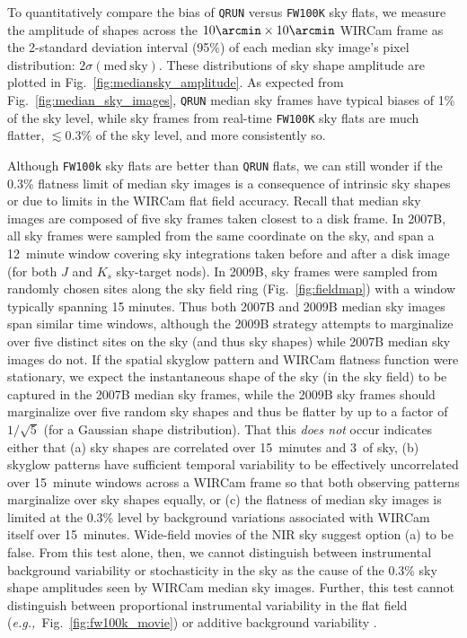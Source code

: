 \documentclass[iop]{emulateapj}
\newcommand{\eg}{\textit{e.g.,~}}
\newcommand{\Fig}[1]{Fig.~\ref{fig:#1}}  %
\begin{document}
To quantitatively compare the bias of \texttt{QRUN} versus \texttt{FW100K} sky flats, we measure the amplitude of shapes across the $10\arcmin \times 10\arcmin$ WIRCam frame as the 2-standard deviation interval (95\%) of each median sky image's pixel distribution: $2 \sigma(\mathrm{med~sky})$.
These distributions of sky shape amplitude are plotted in \Fig{mediansky_amplitude}.
As expected from \Fig{median_sky_images}, \texttt{QRUN} median sky frames have typical biases of 1\% of the sky level, while sky frames from real-time \texttt{FW100K} sky flats are much flatter, $\lesssim 0.3\%$ of the sky level, and more consistently so.

Although \texttt{FW100k} sky flats are better than \texttt{QRUN} flats, we can still wonder if the 0.3\% flatness limit of median sky images is a consequence of intrinsic sky shapes or due to limits in the WIRCam flat field accuracy.
Recall that median sky images are composed of five sky frames taken closest to a disk frame.
In 2007B, all sky frames were sampled from the same coordinate on the sky, and span a 12~minute window covering sky integrations taken before and after a disk image (for both $J$ and $K_s$ sky-target nods).
In 2009B, sky frames were sampled from randomly chosen sites along the sky field ring (\Fig{fieldmap}) with a window typically spanning 15 minutes.
Thus both 2007B and 2009B median sky images span similar time windows, although the 2009B strategy attempts to marginalize over five distinct sites  on the sky (and thus sky shapes) while 2007B median sky images do not.
If the spatial skyglow pattern and WIRCam flatness function were stationary, we expect the instantaneous shape of the sky (in the sky field) to be captured in the 2007B median sky frames, while the 2009B sky frames should marginalize over five random sky shapes and thus be flatter by up to a factor of $1/\sqrt{5}$ (for a Gaussian shape distribution).
That this \emph{does not} occur indicates either that (a) sky shapes are correlated over 15~minutes and 3\arcdeg\ of sky, (b) skyglow patterns have sufficient temporal variability to be effectively uncorrelated over 15~minute windows across a WIRCam frame so that both observing patterns marginalize over sky shapes equally, or (c) the flatness of median sky images is limited at the 0.3\% level by background variations associated with WIRCam itself over 15~minutes.
Wide-field movies of the NIR sky \citep{Adams:1996} suggest option (a) to be false.
From this test alone, then, we cannot distinguish between instrumental background variability or stochasticity in the sky as the cause of the 0.3\% sky shape amplitudes seen by WIRCam median sky images.
Further, this test cannot distinguish between proportional instrumental variability in the flat field (\eg \Fig{fw100k_movie}) or additive background variability \citep[as seen in the CFHT-IR camera,][]{Vaduvescu:2004}.
\end{document}
